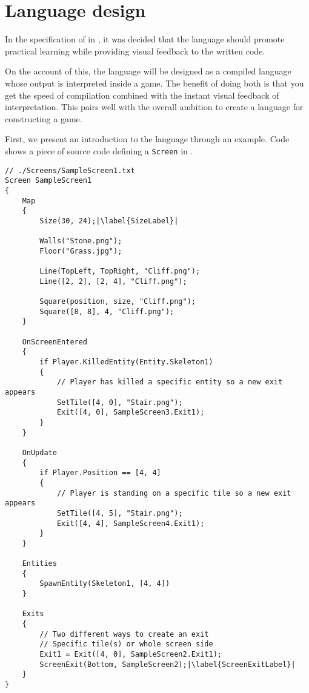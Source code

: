 \chapter{Language design}\label{chap:language_design}
In the specification of \dazel{} in , it was decided that the language should promote practical learning while providing visual feedback to the written code. 

On the account of this, the \dazel{} language will be designed as a compiled language whose output is interpreted inside a game.
The benefit of doing both is that you get the speed of compilation combined with the instant visual feedback of interpretation.
This pairs well with the overall ambition to create a language for constructing a game.

First, we present an introduction to the \dazel{} language through an example. Code  shows a piece of source code defining a \texttt{Screen} in \dazel{}.

\begin{lstlisting}[language=CSharp, caption={Example screen.}, label={lst:SampleScreen1},escapechar=|]
// ./Screens/SampleScreen1.txt
Screen SampleScreen1 
{
    Map 
    {
        Size(30, 24);|\label{SizeLabel}|

        Walls("Stone.png"); 
        Floor("Grass.jpg");

        Line(TopLeft, TopRight, "Cliff.png");
        Line([2, 2], [2, 4], "Cliff.png");

        Square(position, size, "Cliff.png");
        Square([8, 8], 4, "Cliff.png");
    }

    OnScreenEntered
    {
        if Player.KilledEntity(Entity.Skeleton1) 
        {
            // Player has killed a specific entity so a new exit appears
            SetTile([4, 0], "Stair.png");
            Exit([4, 0], SampleScreen3.Exit1);
        }
    }

    OnUpdate
    {
        if Player.Position == [4, 4] 
        {
            // Player is standing on a specific tile so a new exit appears
            SetTile([4, 5], "Stair.png");
            Exit([4, 4], SampleScreen4.Exit1);
        }
    }

    Entities
    {
        SpawnEntity(Skeleton1, [4, 4])
    }
    
    Exits 
    {
        // Two different ways to create an exit
        // Specific tile(s) or whole screen side
        Exit1 = Exit([4, 0], SampleScreen2.Exit1);
        ScreenExit(Bottom, SampleScreen2);|\label{ScreenExitLabel}|
    }
}
\end{lstlisting}

